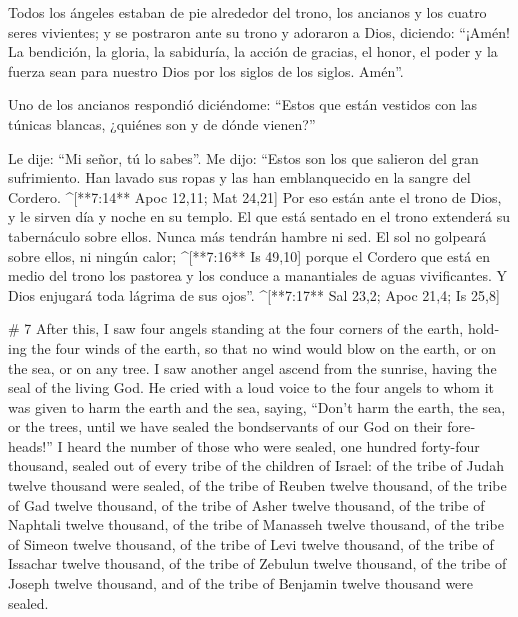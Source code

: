 \begin{paracols}{2}
 Todos los ángeles estaban de pie alrededor del trono, los ancianos y los cuatro seres vivientes; y se postraron ante su trono y adoraron a Dios,  diciendo: “¡Amén! La bendición, la gloria, la sabiduría, la acción de gracias, el honor, el poder y la fuerza sean para nuestro Dios por los siglos de los siglos. Amén”.

 Uno de los ancianos respondió diciéndome: “Estos que están vestidos con las túnicas blancas, ¿quiénes son y de dónde vienen?”

 Le dije: “Mi señor, tú lo sabes”. Me dijo: “Estos son los que salieron del gran sufrimiento. Han lavado sus ropas y las han emblanquecido en la sangre del Cordero. ^[**7:14** Apoc 12,11; Mat 24,21]  Por eso están ante el trono de Dios, y le sirven día y noche en su templo. El que está sentado en el trono extenderá su tabernáculo sobre ellos.  Nunca más tendrán hambre ni sed. El sol no golpeará sobre ellos, ni ningún calor; ^[**7:16** Is 49,10]  porque el Cordero que está en medio del trono los pastorea y los conduce a manantiales de aguas vivificantes. Y Dios enjugará toda lágrima de sus ojos”. ^[**7:17** Sal 23,2; Apoc 21,4; Is 25,8]

\switchcolumn
\begin{english}

# 7
 After this, I saw four angels standing at the four corners of the earth, holding the four winds of the earth, so that no wind would blow on the earth, or on the sea, or on any tree.  I saw another angel ascend from the sunrise, having the seal of the living God. He cried with a loud voice to the four angels to whom it was given to harm the earth and the sea,  saying, “Don’t harm the earth, the sea, or the trees, until we have sealed the bondservants of our God on their foreheads!”  I heard the number of those who were sealed, one hundred forty-four thousand, sealed out of every tribe of the children of Israel:  of the tribe of Judah twelve thousand were sealed, of the tribe of Reuben twelve thousand, of the tribe of Gad twelve thousand,  of the tribe of Asher twelve thousand, of the tribe of Naphtali twelve thousand, of the tribe of Manasseh twelve thousand,  of the tribe of Simeon twelve thousand, of the tribe of Levi twelve thousand, of the tribe of Issachar twelve thousand,  of the tribe of Zebulun twelve thousand, of the tribe of Joseph twelve thousand, and of the tribe of Benjamin twelve thousand were sealed. 


\end{english}
\end{paracols}
